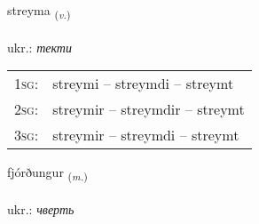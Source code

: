 \documentclass[frontgrid, backgrid]{flacards}\usepackage[]{graphicx}\usepackage[]{xcolor}
\begin{document}
\renewcommand{\flhead}{\vskip5pt \fboxsep=0pt {\small\bfseries\footnotesize Sagnorð | дієслово}}
\renewcommand{\fcfoot}{\vskip5pt \fboxsep=0pt \hspace{2pt}{\small\bfseries\footnotesize 3K}}

\renewcommand{\blhead}{\vskip5pt {\small\bfseries\footnotesize Sagnorð | дієслово }}
\renewcommand{\bcfoot}{\vskip5pt \hspace{2pt}{\small\bfseries\footnotesize 3K}}


{streyma \small{\textsubscript{(\textit{v.})}} \\[1ex] %
\textphonetic{[streiːma]} \\
ukr.: \emph{текти} \\  [2ex]
\renewcommand*{\arraystretch}{0.8}
\begin{tabular}{p{1cm}l}
\textsc{1sg}: & streymi -- streymdi -- streymt \\ 
\textsc{2sg}: & streymir -- streymdir -- streymt \\ 
\textsc{3sg}: & streymir -- streymdi -- streymt \\ 
\end{tabular}
}

\renewcommand{\flhead}{\vskip5pt \fboxsep=0pt {\small\bfseries\footnotesize Nafnorð | іменник}}
\renewcommand{\fcfoot}{\vskip5pt \fboxsep=0pt \hspace{2pt}{\small\bfseries\footnotesize 3K}}

\renewcommand{\blhead}{\vskip5pt {\small\bfseries\footnotesize Nafnorð | іменник }}
\renewcommand{\bcfoot}{\vskip5pt \hspace{2pt}{\small\bfseries\footnotesize 3K}}


{fjórðungur \small{\textsubscript{(\textit{m.})}} \\[1ex] %
\textphonetic{[fjourðuŋkʏr]} \\
ukr.: \emph{чверть} \\  [2ex]
\renewcommand*{\arraystretch}{0.8}
}
\end{document}
